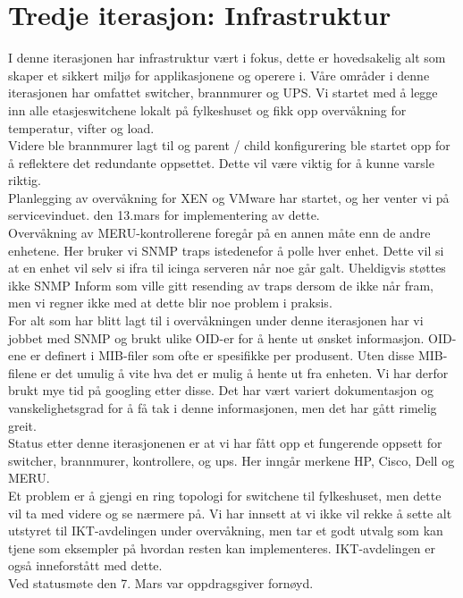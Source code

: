 

\date{Onsdag 8. Mars 2013}




\maketitle
\section*{Tredje iterasjon: Infrastruktur}
I denne iterasjonen har infrastruktur vært i fokus, dette er hovedsakelig alt som skaper et sikkert miljø for applikasjonene og operere i. Våre områder i denne iterasjonen har omfattet switcher, brannmurer og UPS. Vi startet med å legge inn alle etasjeswitchene lokalt på fylkeshuset og fikk opp overvåkning for temperatur, vifter og load.\\

\noindent Videre ble brannmurer lagt til og parent / child konfigurering ble startet opp for å reflektere det redundante oppsettet. Dette vil være viktig for å kunne varsle riktig.\\

\noindent Planlegging av overvåkning for XEN og VMware har startet, og her venter vi på servicevinduet. den 13.mars for implementering av dette.\\

\noindent Overvåkning av MERU-kontrollerene foregår på en annen måte enn de andre enhetene. Her bruker vi SNMP traps istedenefor å polle hver enhet. Dette vil si at en enhet vil selv si ifra til icinga serveren når noe går galt. Uheldigvis støttes ikke SNMP Inform som ville gitt resending av traps dersom de ikke når fram, men vi regner ikke med at dette blir noe problem i praksis.\\

\noindent For alt som har blitt lagt til i overvåkningen under denne iterasjonen har vi jobbet med SNMP og brukt ulike OID-er for å hente ut ønsket informasjon. OID-ene er definert i MIB-filer som ofte er spesifikke per produsent. Uten disse MIB-filene er det umulig å vite hva det er mulig å hente ut fra enheten. Vi har derfor brukt mye tid på googling etter disse. Det har vært variert dokumentasjon og vanskelighetsgrad for å få tak i denne informasjonen, men det har gått rimelig greit.\\

\noindent Status etter denne iterasjonenen er at vi har fått opp et fungerende oppsett for switcher, brannmurer, kontrollere, og ups. Her inngår merkene HP, Cisco, Dell og MERU.\\

\noindent Et problem er å gjengi en ring topologi for switchene til fylkeshuset, men dette vil ta med videre og se nærmere på. Vi har innsett at vi ikke vil rekke å sette alt utstyret til IKT-avdelingen under overvåkning, men tar et godt utvalg som kan tjene som eksempler på hvordan resten kan implementeres. IKT-avdelingen er også inneforstått med dette.\\

\noindent Ved statusmøte den 7. Mars var oppdragsgiver fornøyd.


